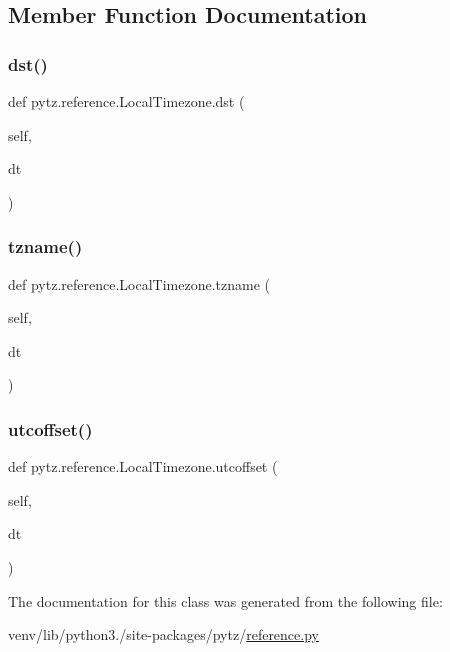 \subsection{Member Function Documentation}
\mbox{\label{classpytz_1_1reference_1_1LocalTimezone_a6b256a8380be30f20b51eed45417cf8a}} 
\subsubsection{\texorpdfstring{dst()}{dst()}}
{\footnotesize\ttfamily def pytz.\+reference.\+Local\+Timezone.\+dst (\begin{DoxyParamCaption}\item[{}]{self,  }\item[{}]{dt }\end{DoxyParamCaption})}

\mbox{\label{classpytz_1_1reference_1_1LocalTimezone_a8c560431b780b471ea3d03d0b2b7f3d1}} 
\subsubsection{\texorpdfstring{tzname()}{tzname()}}
{\footnotesize\ttfamily def pytz.\+reference.\+Local\+Timezone.\+tzname (\begin{DoxyParamCaption}\item[{}]{self,  }\item[{}]{dt }\end{DoxyParamCaption})}

\mbox{\label{classpytz_1_1reference_1_1LocalTimezone_a5ee2540a8c905e3a47d2a93943c4b73f}} 
\subsubsection{\texorpdfstring{utcoffset()}{utcoffset()}}
{\footnotesize\ttfamily def pytz.\+reference.\+Local\+Timezone.\+utcoffset (\begin{DoxyParamCaption}\item[{}]{self,  }\item[{}]{dt }\end{DoxyParamCaption})}



The documentation for this class was generated from the following file\+:\begin{DoxyCompactItemize}
\item 
venv/lib/python3./site-\/packages/pytz/\hyperlink{reference_8py}{reference.\+py}\end{DoxyCompactItemize}
